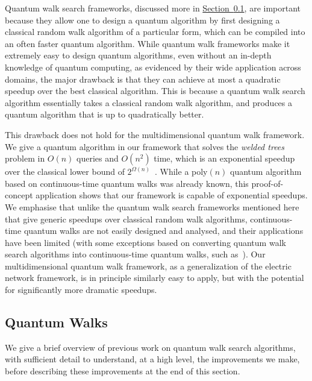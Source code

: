 \documentclass{theoretics}
\renewcommand{\sec}[1]{\hyperref[sec:#1]{Section~\ref*{sec:#1}}}
\renewcommand{\>}{\rangle}
\newcommand{\<}{\langle}
\renewcommand{\(}{\left(}
\renewcommand{\)}{\right)}
\begin{document}
Quantum walk search frameworks, discussed more in \sec{intro-QW}, are important because they allow one to design a quantum algorithm by first designing a classical random walk algorithm of a particular form, which can be compiled into an often faster quantum algorithm.  
While quantum walk frameworks make it extremely easy to design quantum algorithms, even without an in-depth knowledge of quantum computing, as evidenced by their wide application across domains, the major drawback is that they can achieve at most a quadratic speedup over the best classical algorithm. This is because a quantum walk search algorithm essentially takes a classical random walk algorithm, and produces a quantum algorithm that is up to quadratically better. 

This drawback does not hold for the multidimensional quantum walk framework. We give a quantum algorithm in our framework that solves the \emph{welded trees} problem in $O(n)$ queries and $O(n^2)$ time, which is an exponential speedup over the classical lower bound of $2^{\Omega(n)}$~\cite{childs2003ExpSpeedupQW}. While a poly$(n)$ quantum algorithm based on continuous-time quantum walks was already known, this proof-of-concept application shows that our framework is capable of exponential speedups. We emphasise that unlike the quantum walk search frameworks mentioned here that give generic speedups over classical random walk algorithms, continuous-time quantum walks are not easily designed and analysed, and their applications have been limited (with some exceptions based on converting quantum walk search algorithms into continuous-time quantum walks, such as~\cite{apers2022quadratic}). Our multidimensional quantum walk framework, as a generalization of the electric network framework, is in principle similarly easy to apply, but with the potential for significantly more dramatic speedups. 




\subsection{Quantum Walks}\label{sec:intro-QW}

We give a brief overview of previous work on quantum walk search algorithms, with sufficient detail to understand, at a high level, the improvements we make, before describing these improvements at the end of this section.
\end{document}
